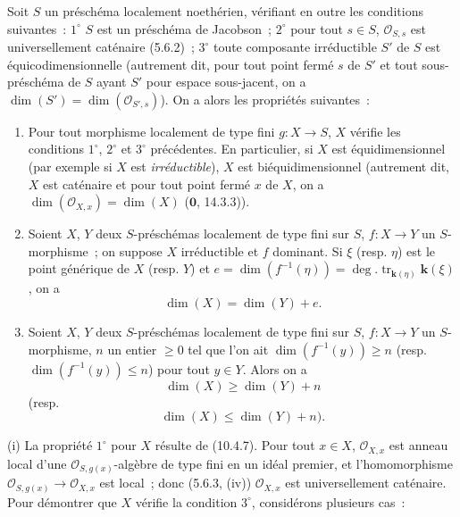 \begin{proposition}[10.6.1]
\label{IV.10.6.1-fr}
Soit $S$ un préschéma localement noethérien, vérifiant en outre les conditions
suivantes~: $1^\circ$ $S$ est un préschéma de Jacobson~; $2^\circ$ pour tout
$s\in S$, $\mathcal O_{S,s}$ est universellement caténaire \textup{(5.6.2)}~; $3^\circ$ toute
composante irréductible $S'$ de $S$ est équicodimensionnelle \textup{(autrement dit, pour
tout point fermé $s$ de $S'$ et tout sous-préschéma de $S$ ayant $S'$ pour espace
sous-jacent, on a $\dim(S')=\dim(\mathcal O_{S',s})$)}. On a alors les propriétés
suivantes~:
\begin{enumerate}[label=\textup{(\roman*)}]
  \item Pour tout morphisme localement de type fini $g:X\to S$, $X$ vérifie les
  conditions $1^\circ$, $2^\circ$ et $3^\circ$ précédentes. En particulier, si $X$
  est équidimensionnel \textup{(par exemple si $X$ est \emph{irréductible})}, $X$ est
  biéquidimensionnel \textup{(autrement dit, $X$ est caténaire et pour tout point fermé
  $x$ de $X$, on a $\dim(\mathcal O_{X,x})=\dim(X)$ ($\mathbf 0$, 14.3.3))}.
  \item Soient $X$, $Y$ deux $S$-préschémas localement de type fini sur $S$,
  $f:X\to Y$ un $S$-morphisme~; on suppose $X$ irréductible et $f$ dominant. Si
  $\xi$ \textup{(resp. $\eta$)} est le point générique de $X$ \textup{(resp. $Y$)} et
  $e=\dim(f^{-1}(\eta))=\deg.\operatorname{tr}_{\mathbf{k}(\eta)}\boldsymbol{k}(\xi)$, on a
  \begin{equation}
  \label{IV.10.6.1.1-fr}
  \tag{10.6.1.1}
  \dim(X)=\dim(Y)+e.
  \end{equation}
  \item Soient $X$, $Y$ deux $S$-préschémas localement de type fini sur $S$,
  $f:X\to Y$ un $S$-morphisme, $n$ un entier $\geq0$ tel que l'on ait
  $\dim(f^{-1}(y))\geq n$ \textup{(resp. $\dim(f^{-1}(y))\leq n$)} pour tout $y\in Y$.
  Alors on a
  \begin{equation}
  \label{IV.10.6.1.2-fr}
  \tag{10.6.1.2}
  \dim(X)\geq\dim(Y)+n
  \end{equation}
  \textup{(resp.}
  \begin{equation}
  \label{IV.10.6.1.3-fr}
  \tag{10.6.1.3}
  \dim(X)\leq\dim(Y)+n).
  \end{equation}
\end{enumerate}
\end{proposition}

(i) La propriété $1^\circ$ pour $X$ résulte de (10.4.7). Pour tout $x\in X$,
$\mathcal O_{X,x}$ est anneau local d'une $\mathcal O_{S,g(x)}$-algèbre de type fini en
un idéal premier, et l'homomorphisme
$\mathcal O_{S,g(x)}\to\mathcal O_{X,x}$
est local~; donc (5.6.3, (iv)) $\mathcal O_{X,x}$ est universellement caténaire. Pour
démontrer que $X$ vérifie la condition $3^\circ$, considérons plusieurs cas~:

